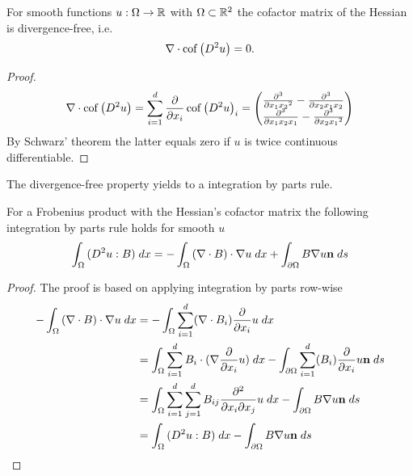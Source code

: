 \begin{lemma} \label{la: divergence free cof}
For smooth functions $u:\Omega \rightarrow \mathbb{R}$ with $\Omega \subset \mathbb{R}^2$ the cofactor matrix of the Hessian is divergence-free, i.e.
\[
	\nabla \cdot \operatorname{cof} \left( D^2 u \right) = 0.
\] 
\end{lemma}
\begin{proof}
\begin{align*}
	\nabla \cdot \operatorname{cof} \left( D^2 u \right) = \sum_{i=1}^{d} \frac \partial {\partial  x_i}\operatorname{cof} \left( D^2 u \right)_i = 
	\begin{pmatrix}
		\frac {\partial^3} {\partial x_1 {x_2}^2 } -\frac {\partial^3} {\partial{x_2} x_1 {x_2}} \\
				\frac {\partial^3} {\partial {x_1}x_2 {x_1}} -\frac {\partial^3} {\partial x_2 {x_1}^2 }
	\end{pmatrix}
\end{align*}
By Schwarz' theorem the latter equals zero if $u$ is twice continuous differentiable.
\end{proof}

The divergence-free property yields to a integration by parts rule.
\begin{lemma} \label{la: integration by parts Frobenius}
For a Frobenius product with the Hessian's cofactor matrix  the following integration by parts rule holds for smooth $u$
\[
	\int_{\Omega} {{ (D^2 u : B)}\;dx} = 
		- \int_{\Omega} {{ (\nabla \cdot B) \cdot \nabla u }\;dx}
		+ \int_{\partial \Omega} {{  B \nabla u \bf n}\;ds}
\] 
\end{lemma}

\begin{proof}
The proof is based on applying integration by parts row-wise
\begin{align*}
- \int_{\Omega} {{ (\nabla \cdot B) \cdot \nabla u}\;dx} &= 
- \int_{\Omega} {{ \sum_{i = 1}^{d} (\nabla \cdot B_i) \frac \partial {\partial x_i} u}\;dx} \\
&=  \int_{\Omega} {{ \sum_{i = 1}^{d} B_i \cdot  (\nabla \frac \partial {\partial x_i} u)}\;dx} 
	- \int_{\partial \Omega} {{ \sum_{i = 1}^{d} (B_i) \frac \partial {\partial x_i} u \mathbf{n}}\;ds} \\
&=  \int_{\Omega} {{ \sum_{i = 1}^{d}\sum_{j= 1}^{d} B_{ij} \frac {\partial^2} {\partial x_i\partial x_j} u}\;dx}
	- \int_{\partial \Omega} {{ B \nabla u \mathbf{n}}\;ds} \\
&=  \int_{\Omega} {{ (D^2 u : B)}\;dx}
	- \int_{\partial \Omega} {{ B \nabla u \mathbf{n} }\;ds}
\end{align*}
\end{proof}

